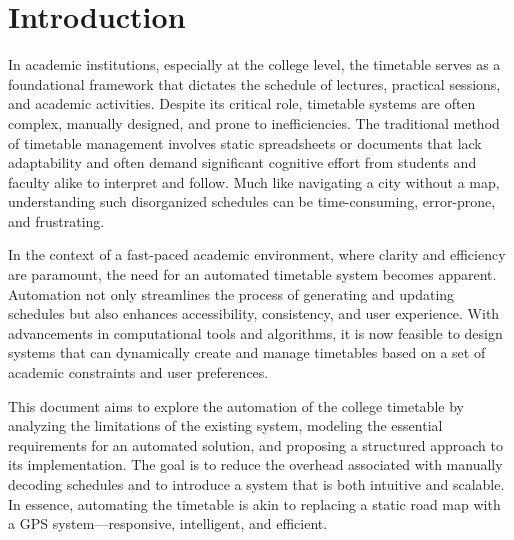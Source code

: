 \documentclass[a4paper,12pt]{article}
\begin{document}
\section{Introduction}
In academic institutions, especially at the college level, the timetable serves as a foundational framework that dictates the schedule of lectures, practical sessions, and academic activities. Despite its critical role, timetable systems are often complex, manually designed, and prone to inefficiencies. The traditional method of timetable management involves static spreadsheets or documents that lack adaptability and often demand significant cognitive effort from students and faculty alike to interpret and follow. Much like navigating a city without a map, understanding such disorganized schedules can be time-consuming, error-prone, and frustrating.\newline

In the context of a fast-paced academic environment, where clarity and efficiency are paramount, the need for an automated timetable system becomes apparent. Automation not only streamlines the process of generating and updating schedules but also enhances accessibility, consistency, and user experience. With advancements in computational tools and algorithms, it is now feasible to design systems that can dynamically create and manage timetables based on a set of academic constraints and user preferences.\newline

This document aims to explore the automation of the college timetable by analyzing the limitations of the existing system, modeling the essential requirements for an automated solution, and proposing a structured approach to its implementation. The goal is to reduce the overhead associated with manually decoding schedules and to introduce a system that is both intuitive and scalable. In essence, automating the timetable is akin to replacing a static road map with a GPS system—responsive, intelligent, and efficient.
\end{document}
